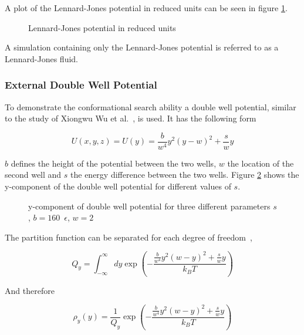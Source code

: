 \documentclass[a4paper]{article}
\begin{document}
A plot of the Lennard-Jones potential in reduced units can be seen in figure \ref{im:lennard_jones}.

\begin{figure} [H]
\centering

\caption{Lennard-Jones potential in reduced units}
\label{im:lennard_jones}
\end{figure}


A simulation containing only the Lennard-Jones potential is referred to as a Lennard-Jones fluid.

\subsubsection{External Double Well Potential}

To demonstrate the conformational search ability a double well potential, similar to the study of Xiongwu Wu et al.~\cite{XiongwuWu2011a}, is used. It has the following form

\begin{equation}
U(x,y,z) = U(y) = \frac{b}{w^4} y^2 (y - w)^2 + \frac{s}{w}y
\label{eq:external-double-well}
\end{equation}

$b$ defines the height of the potential between the two wells, $w$ the location of the second well and $s$ the energy difference between the two wells. Figure \ref{im:double_well} shows the y-component of the double well potential for different values of $s$.

\begin{figure} [H]
\centering

\caption{y-component of double well potential for three different parameters $s$, $b = 160 \enspace \epsilon$, $w = 2$~\cite{XiongwuWu2012}}
\label{im:double_well}
\end{figure}

The partition function can be separated for each degree of freedom~\cite{XiongwuWu2012},

\begin{equation}
Q_y = \int_{- \infty}^{\infty} dy \exp \left( - \frac{\frac{b}{w^4} y^2 (w-y)^2 + \frac{s}{w} y}{k_B T} \right)
\label{eq:double-well-partition}
\end{equation}

And therefore

\begin{equation}
\rho_y (y) = \frac{1}{Q_y} \exp \left( - \frac{\frac{b}{w^4} y^2 (w-y)^2 + \frac{s}{w} y}{k_B T} \right)
\label{eq:double-well-something}
\end{equation}
\end{document}
